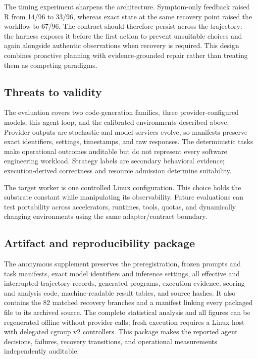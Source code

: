 \documentclass[sigconf,anonymous]{aamas}
\begin{document}
The timing experiment sharpens the architecture. Symptom-only feedback raised R
from 14/96 to 33/96, whereas exact state at the same recovery point raised the
workflow to 67/96. The contract should therefore persist across the trajectory:
the harness exposes it before the first action to prevent unsuitable choices and
again alongside authentic observations when recovery is required. This design
combines proactive planning with evidence-grounded repair rather than treating
them as competing paradigms.

\subsection{Threats to validity}

The evaluation covers two code-generation families, three provider-configured
models, this agent loop, and the calibrated environments described above.
Provider outputs are stochastic and model services evolve, so manifests preserve
exact identifiers, settings, timestamps, and raw responses. The deterministic
tasks make operational outcomes auditable but do not represent every software
engineering workload. Strategy labels are secondary behavioral evidence;
execution-derived correctness and resource admission determine suitability.

The target worker is one controlled Linux configuration. This choice holds the
substrate constant while manipulating its observability. Future evaluations can
test portability across accelerators, runtimes, tools, quotas, and dynamically
changing environments using the same adapter/contract boundary.

\subsection{Artifact and reproducibility package}

The anonymous supplement preserves the preregistration, frozen prompts and task
manifests, exact model identifiers and inference settings, all effective and
interrupted trajectory records, generated programs, execution evidence, scoring
and analysis code, machine-readable result tables, and source hashes. It also
contains the 82 matched recovery branches and a manifest linking every packaged
file to its archived source. The complete statistical analysis and all figures
can be regenerated offline without provider calls; fresh execution requires a
Linux host with delegated cgroup v2 controllers. This package makes the reported
agent decisions, failures, recovery transitions, and operational measurements
independently auditable.
\end{document}
